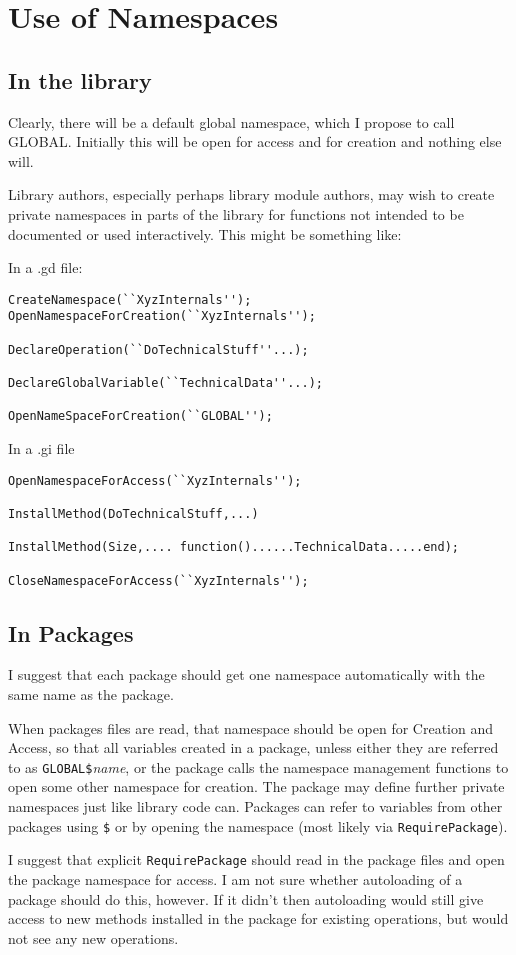 \documentclass{article}
\begin{document}
\section{Use of Namespaces}

\subsection{In the library}

Clearly, there will be a default global namespace, which I propose to
call GLOBAL. Initially this will be open for access and for creation
and nothing else will.

Library authors, especially perhaps library module authors, may wish
to create private namespaces in parts of the library for functions not
intended to be documented or used interactively. This might be
something like:


In a .gd file:
\begin{verbatim}
CreateNamespace(``XyzInternals'');
OpenNamespaceForCreation(``XyzInternals'');

DeclareOperation(``DoTechnicalStuff''...);

DeclareGlobalVariable(``TechnicalData''...);

OpenNameSpaceForCreation(``GLOBAL'');
\end{verbatim}

In a .gi file
\begin{verbatim}
OpenNamespaceForAccess(``XyzInternals'');

InstallMethod(DoTechnicalStuff,...)

InstallMethod(Size,.... function()......TechnicalData.....end);

CloseNamespaceForAccess(``XyzInternals'');
\end{verbatim}

\subsection{In Packages}

I suggest that each package should get one namespace automatically
with the same name as the package. 

When packages files are read, that namespace should be open for
Creation and Access, so that all variables created in a package,
unless either they are referred to as \verb|GLOBAL$|\textit{name}, or
the package calls the namespace management functions to open some
other namespace for creation. The package may define further private
namespaces just like library code can. Packages can refer to variables
from other packages using \verb|$| or by opening the namespace (most
likely via \verb|RequirePackage|).

I suggest that explicit \verb|RequirePackage| should read in the
package files and open the package namespace for access. I am not sure
whether autoloading of a package should do this, however. If it didn't
then autoloading would still give access to new methods installed in
the package for existing operations, but would not see any new
operations.
\end{document}
